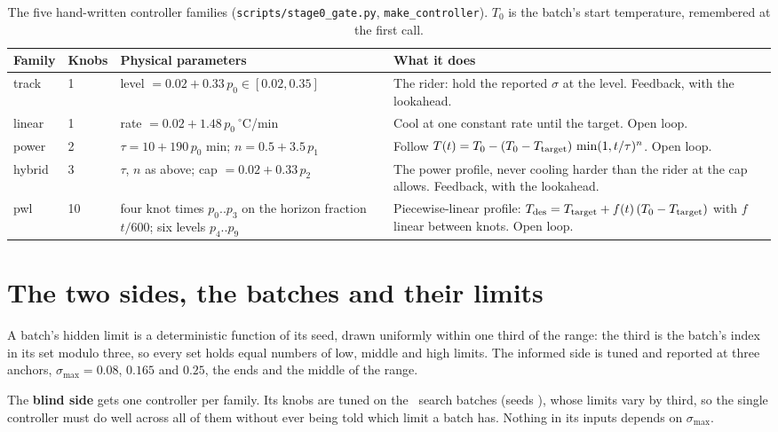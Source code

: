 \documentclass[11pt,a4paper]{article}
\newcommand{\smax}{\sigma_{\max}}
\begin{document}
\begin{table}[h]
\centering\small
\begin{tabular}{@{}llp{4.4cm}p{5.8cm}@{}}
\toprule
Family & Knobs & Physical parameters & What it does \\
\midrule
track & 1 & level $= 0.02 + 0.33\,p_0 \in [0.02, 0.35]$ &
  The rider: hold the reported $\sigma$ at the level. Feedback, with the
  lookahead. \\
linear & 1 & rate $= 0.02 + 1.48\,p_0\ ^\circ$C/min &
  Cool at one constant rate until the target. Open loop. \\
power & 2 & $\tau = 10 + 190\,p_0$ min; $n = 0.5 + 3.5\,p_1$ &
  Follow $T(t) = T_0 - (T_0 - T_{\rm target})\,\min(1, t/\tau)^{n}$.
  Open loop. \\
hybrid & 3 & $\tau$, $n$ as above; cap $= 0.02 + 0.33\,p_2$ &
  The power profile, never cooling harder than the rider at the cap
  allows. Feedback, with the lookahead. \\
pwl & 10 & four knot times $p_0..p_3$ on the horizon fraction $t/600$;
  six levels $p_4..p_9$ &
  Piecewise-linear profile: $T_{\rm des} = T_{\rm target} + f(t)\,(T_0 -
  T_{\rm target})$ with $f$ linear between knots. Open loop. \\
\bottomrule
\end{tabular}
\caption{The five hand-written controller families
(\texttt{scripts/stage0\_gate.py}, \texttt{make\_controller}). $T_0$ is the
batch's start temperature, remembered at the first call.}
\label{tab:families}
\end{table}

\section{The two sides, the batches and their limits}

A batch's hidden limit is a deterministic function of its seed, drawn
uniformly within one third of the range: the third is the batch's index in
its set modulo three, so every set holds equal numbers of low, middle and
high limits. The informed side is tuned and reported at three anchors,
$\smax = 0.08$, $0.165$ and $0.25$, the ends and the middle of the range.

The \textbf{blind side} gets one controller per family. Its knobs are tuned
on the \SZnsearch\ search batches (seeds \SZsearchseeds), whose limits vary
by third, so the single controller must do well across all of them without
ever being told which limit a batch has. Nothing in its inputs depends on
$\smax$.
\end{document}
